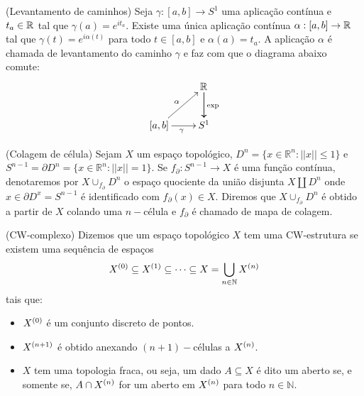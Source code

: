 \documentclass{beamer}
\begin{document}
\begin{frame}
	
	\begin{proposicao}
		(Levantamento de caminhos) Seja $\gamma:[a,b] \to S^{1}$ uma aplicação contínua e $t_{a}\in \mathbb{R}^{}$ tal que $\gamma(a) = e^{it_{a}}$. Existe uma única aplicação contínua $\alpha:[a,b] \to \mathbb{R}^{}$ tal que $\gamma(t) = e^{i\alpha(t)}$ para todo $t\in [a,b]$ e $\alpha(a) = t_{a}$. A aplicação $\alpha$ é chamada de levantamento do caminho $\gamma$ e faz com que o diagrama abaixo comute:
		$$
		\xymatrix{
			& \real{}\ar[d]\ar[d]^{\text{exp}}
			\\
			[a,b]\ar[ur]^{\alpha} \ar[r]_{\gamma} & S^{1}
		}
		$$
	\end{proposicao}
	
\end{frame}

\begin{frame}
	\begin{definicao}
		(Colagem de célula) Sejam $X$ um espaço topológico, $D^{n}=\{x\in \mathbb{R}^{n} : ||x|| \leq 1\}$ e $S^{n-1} = \partial D^{n}=\{x\in \mathbb{R}^{n} : ||x|| = 1\}$. Se $f_{\partial}:S^{n-1} \to X$ é uma função contínua, denotaremos por $X\cup_{f_{\partial}}D^{n}$ o espaço quociente da união disjunta $X \coprod D^{n}$ onde $x \in \partial D^{x} = S^{n-1}$ é identificado com $f_{\partial}(x) \in X$. Diremos que $X\cup_{f_{\partial}}D^{n}$ é obtido a partir de $X$ colando uma $n-$célula e $f_{\partial}$ é chamado de mapa de colagem.
	\end{definicao}
\end{frame}

\begin{frame}
	
	\begin{definicao}
		(CW-complexo) Dizemos que um espaço topológico $X$ tem uma CW-estrutura se existem uma sequência de espaços
		$$
		X^{(0)} \subseteq X^{(1)} \subseteq \dots \subseteq X = \bigcup \limits_{n\in \mathbb{N}} X^{(n)}
		$$ 
		tais que:
		\begin{itemize}
			\item $X^{(0)}$ é um conjunto discreto de pontos.
			
			\item $X^{(n+1)}$ é obtido anexando $(n+1)-$células a $X^{(n)}$.
			
			\item $X$ tem uma topologia fraca, ou seja, um dado $A \subseteq X$ é dito um aberto se, e somente se, $A \cap X^{(n)}$ for um aberto em $X^{(n)}$ para todo $n \in \mathbb{N}$.
		\end{itemize}
	\end{definicao}
\end{frame}
\end{document}
